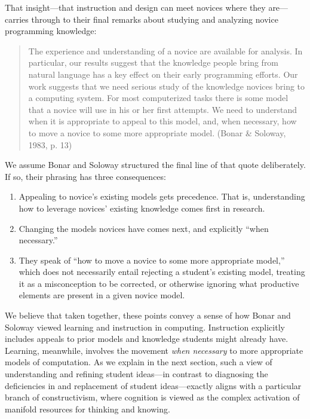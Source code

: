 That insight---that instruction and design can meet novices where they
are---carries through to their final remarks about studying and
analyzing novice programming knowledge:

\begin{quote}
  The experience and understanding of a novice are available for analysis.
  In particular, our results suggest that the knowledge people bring from
  natural language has a key effect on their early programming efforts.
  Our work suggests that we need serious study of the knowledge novices
  bring to a computing system. For most computerized tasks there is some
  model that a novice will use in his or her first attempts. We need to
  understand when it is appropriate to appeal to this model, and, when
  necessary, how to move a novice to some more appropriate model. (Bonar
  \& Soloway, 1983, p. 13)
\end{quote}

We assume Bonar and Soloway structured the final line of that quote deliberately. If
so, their phrasing has three consequences:

\begin{enumerate}
\def\labelenumi{\arabic{enumi}.}
\tightlist
\item
  Appealing to novice's existing models gets precedence. That is,
  understanding how to leverage novices' existing knowledge comes first
  in research.
\item
  Changing the models novices have comes next, and explicitly ``when necessary.''
\item
  They speak of ``how to move a novice to some more appropriate model,''
  which does not necessarily entail rejecting a student's existing model, treating it as a misconception to be corrected, or otherwise ignoring what productive elements are present in a given novice model.
\end{enumerate}

We believe that taken together, these points convey a sense of how Bonar and Soloway \cite{bonar_uncovering_1983}
viewed learning and instruction in computing. Instruction explicitly
includes appeals to prior models and knowledge students might already
have. Learning, meanwhile, involves the movement \emph{when necessary}
to more appropriate models of computation. As we explain in the next
section, such a view of understanding and refining student ideas---in contrast to diagnosing the deficiencies in and replacement of student ideas---exactly aligns with a particular branch of
constructivism, where cognition is viewed as the complex activation of
manifold resources for thinking and knowing.


